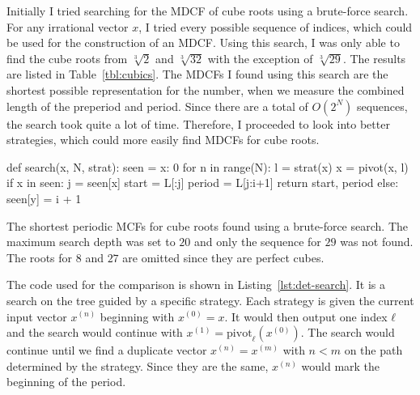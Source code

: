 Initially I tried searching for the MDCF of cube roots
using a brute-force search.
For any irrational vector $x$,
I tried every possible sequence of indices,
which could be used for the construction of an MDCF.
Using this search, I was only able to find the cube roots from $\sqrt[3]{2}$
and $\sqrt[3]{32}$ with the exception of $\sqrt[3]{29}$.
The results are listed in Table~\ref{tbl:cubics}.
The MDCFs I found using this search are the shortest possible representation
for the number, when we measure the combined length of the preperiod and
period.
Since there are a total of $O(2^N)$ sequences,
the search took quite a lot of time.
Therefore, I proceeded to look into better strategies,
which could more easily find MDCFs for cube roots.

\begin{Python}[
    float=tbp,
    numbers=left,
    caption={
      The implementation of the search for periodic MDCFs.
      The strategy \texttt{strat} outputs a single index $ℓ$, which is used
      for pivoting.
      The search stops once a duplicate vector $x$ has been found and the
      program returns the preperiod and period once found.
    },
    label={lst:det-search},
  ]
def search(x, N, strat):
  seen = {x: 0}
  for n in range(N):
    l = strat(x)
    x = pivot(x, l)
    if x in seen:
      j = seen[x]
      start = L[:j]
      period = L[j:i+1]
      return start, period
    else:
      seen[y] = i + 1
\end{Python}

\begin{table}[tbp]
  \caption{
    The shortest periodic MCFs for cube roots found using a
    brute-force search. The maximum search depth was set to $20$ and
    only the sequence for $29$ was not found. The roots for $8$ and $27$ are
    omitted since they are perfect cubes.}
  \label{tbl:cubics}
  \centering
  
\end{table}

The code used for the comparison is shown in Listing~\ref{lst:det-search}.
It is a search on the tree guided by a specific strategy.
Each strategy is given the current input vector $x^{(n)}$ beginning with $x^{(0)} = x$.
It would then output one index $ℓ$ and the search would continue with
$x^{(1)} = \mathrm{pivot}_ℓ(x^{(0)})$.
The search would continue until we find a duplicate vector $x^{(n)} = x^{(m)}$
with $n < m$ on the path determined by the strategy.
Since they are the same, $x^{(n)}$ would mark the beginning of the period.

